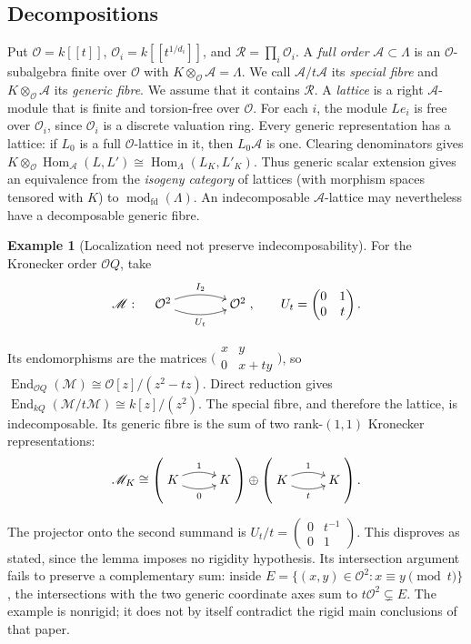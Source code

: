 \documentclass[11pt, reqno]{amsart}
\numberwithin{equation}{section}
\theoremstyle{definition}
\newtheorem{example}[theorem]{Example}
\theoremstyle{remark}
\newcommand{\op}[1]{\operatorname{#1}}
\newcommand{\mr}[1]{\mathrm{#1}}
\newcommand{\mc}[1]{\mathcal{#1}}
\newcommand{\ms}[1]{\mathscr{#1}}
\newcommand{\OO}{\mc O}
\newcommand{\RR}{\mc R}
\newcommand{\End}{\op{End}}
\newcommand{\Hom}{\op{Hom}}
\newcommand{\modfd}{\op{mod}_{\mr{fd}}}
\newcommand{\iso}{\cong}
\newcommand{\quiverdiagram}[1]{\vcenter{\hbox{$\displaystyle #1$}}}
\begin{document}
\subsection{Decompositions}\label{subsec:lattice-splitting}

Put $\OO=k[[t]]$, $\OO_i=k[[t^{1/d_i}]]$, and
$\RR=\prod_i\OO_i$. A \emph{full order} $\ms A\subset\Lambda$ is an $\OO$-subalgebra
finite over $\OO$ with $K\otimes_\OO\ms A=\Lambda$.
We call $\ms A/t\ms A$ its \emph{special fibre} and
$K\otimes_\OO\ms A$ its \emph{generic fibre}. We assume
that it contains $\RR$. A \emph{lattice} is a right $\ms A$-module that is finite
and torsion-free over $\OO$. For each $i$, the module $Le_i$ is free over $\OO_i$, since $\OO_i$
is a discrete valuation ring.
Every generic representation has a lattice: if $L_0$ is a full
$\OO$-lattice in it, then $L_0\ms A$ is one. Clearing denominators gives
$K\otimes_\OO\Hom_{\ms A}(L,L') \iso\Hom_\Lambda(L_K,L'_K)$. 
Thus generic scalar extension gives an equivalence from the
\emph{isogeny category} of lattices (with morphism spaces tensored
with $K$) to $\modfd(\Lambda)$. An indecomposable $\ms A$-lattice
may nevertheless have a decomposable generic fibre.


\begin{example}[Localization need not preserve indecomposability]
\label{ex:localization}
For the Kronecker order $\OO Q$, take
\[ \ms M:\quad\quiverdiagram{\xymatrix@C=4em{\OO^2\ar@/^0.65pc/[r]^{I_2}\ar@/_0.65pc/[r]_{U_t}&\OO^2}},\qquad U_t=\begin{pmatrix}0&1\\0&t\end{pmatrix}. \]

Its endomorphisms are the matrices
$\bigl(\begin{smallmatrix}x&y\\0&x+ty\end{smallmatrix}\bigr)$, so
$\End_{\OO Q}(\ms M)\iso\OO[z]/(z^2-tz)$.
Direct reduction gives $\End_{kQ}(\ms M/t\ms M)\iso k[z]/(z^2)$.
The special fibre, and therefore the lattice, is indecomposable. Its generic fibre is the sum of two rank-$(1,1)$ Kronecker
representations:
\[ \ms M_K\iso
\left(\quiverdiagram{\xymatrix@C=2.6em{K\ar@/^0.55pc/[r]^{1}\ar@/_0.55pc/[r]_{0}&K}}\right)
\oplus
\left(\quiverdiagram{\xymatrix@C=2.6em{K\ar@/^0.55pc/[r]^{1}\ar@/_0.55pc/[r]_{t}&K}}\right). \]

The projector onto the second summand is
$U_t/t=\begin{pmatrix}0&t^{-1}\\0&1\end{pmatrix}$.
This disproves \cite[Lemma~5.17]{GLSrigid} as stated, since the
lemma imposes no rigidity hypothesis. Its intersection argument fails
to preserve a complementary sum: inside
$E=\{(x,y)\in\OO^2:x\equiv y\pmod t\}$, the intersections
with the two generic coordinate axes sum to $t\OO^2\subsetneq E$.
The example is nonrigid; it does not by itself contradict the rigid
main conclusions of that paper.
\end{example}
\end{document}
